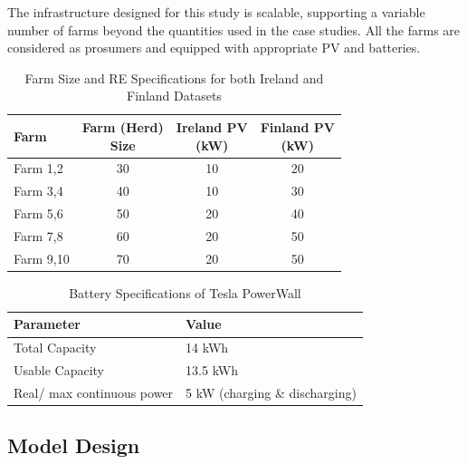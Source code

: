 \documentclass[preprint,12pt]{elsarticle}
\begin{document}
The infrastructure designed for this study is scalable, supporting a variable number of farms beyond the quantities used in the case studies. All the farms are considered as prosumers and equipped with appropriate PV and batteries.


\begin{table}[h]
\centering
\begin{tabular}{lccc}
\hline
\makecell{\textbf{Farm} \\ } & \makecell{\textbf{Farm (Herd)}\\\textbf{Size}} & \makecell{\textbf{Ireland PV}\\\textbf{(kW)}} & \makecell{\textbf{Finland PV}\\\textbf{(kW)}} \\ \hline
Farm 1,2 & 30 & 10 & 20 \\
Farm 3,4 & 40 & 10 & 30 \\
Farm 5,6 & 50 & 20 & 40 \\
Farm 7,8 & 60 & 20 & 50 \\
Farm 9,10 & 70 & 20 & 50 \\ \hline
\end{tabular}
\caption{Farm Size and RE Specifications for both Ireland and Finland Datasets}
\label{FarmsSpecs}
\end{table}



\begin{table}[ht]
    \centering
    \caption{Battery Specifications of Tesla PowerWall \cite{Teslapower}}
    \begin{tabular}{ll}
        \hline
        \textbf{Parameter} & \textbf{Value} \\
        \hline
        Total Capacity & 14 kWh \\
        Usable Capacity & 13.5 kWh \\
        Real/ max continuous power & 5 kW (charging \& discharging) \\
        \hline
    \end{tabular}
    \label{batteryspecs}
\end{table}






\subsection{Model Design}
\label{techniques}
\end{document}

